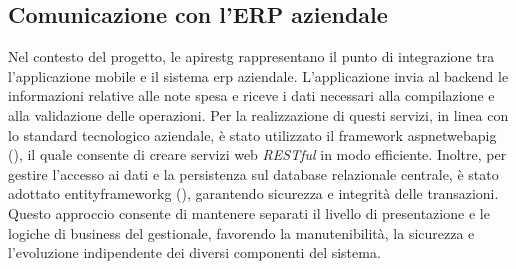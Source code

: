\subsection*{Comunicazione con l'ERP aziendale}
\label{subsec:comunicazione-erp}
\noindent Nel contesto del progetto, le \gls{apirestg} rappresentano il punto di integrazione tra l'applicazione mobile e il sistema \gls{erp} aziendale. L'applicazione invia al backend le informazioni relative alle note spesa e riceve i dati necessari alla compilazione e alla validazione delle operazioni. \newline 
Per la realizzazione di questi servizi, in linea con lo standard tecnologico aziendale, è stato utilizzato il framework \gls{aspnetwebapig} (\cite{site:aspnet-webapi}), il quale consente di creare servizi web \textit{RESTful} in modo efficiente. Inoltre, per gestire l'accesso ai dati e la persistenza sul database relazionale centrale, è stato adottato \gls{entityframeworkg} (\cite{site:ef6}), garantendo sicurezza e integrità delle transazioni. Questo approccio consente di mantenere separati il livello di presentazione e le logiche di business del gestionale, favorendo la manutenibilità, la sicurezza e l'evoluzione indipendente dei diversi componenti del sistema.


\newpage